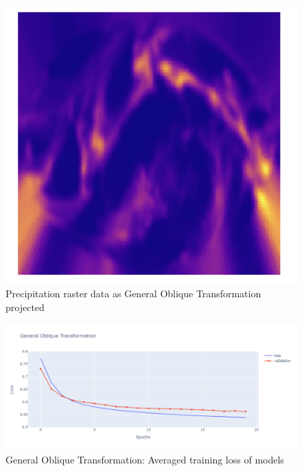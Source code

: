 \begin{figure}[h]
\begin{minipage}{0.30\textwidth}
        \label{fig:ob_tran_proj}
    \end{minipage}\hfill
    \begin{minipage}{0.30\textwidth}
        \centering
        \includegraphics[width=0.9\linewidth]{figures/chapter-8/prect_got.png}
        \caption{Precipitation raster data as General Oblique Transformation projected}
        \label{fig:ob_tran_prect_raster}
    \end{minipage}\hfill
\end{figure}

\begin{figure}[h]
    \centering
    \includegraphics[width=1.0\linewidth]{figures/chapter-8/got_loss.png}
    \caption{General Oblique Transformation: Averaged training loss of models  }
    \label{fig:got_loss}
\end{figure}
